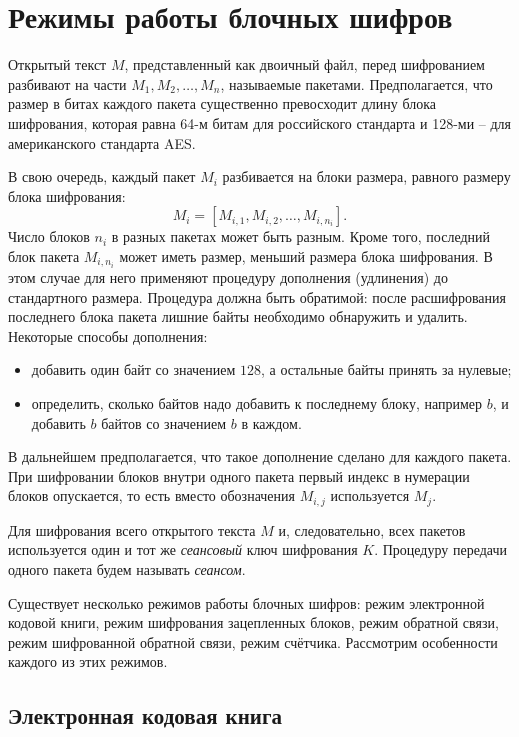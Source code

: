 \section{Режимы работы блочных шифров}\label{section-block-chaining}

Открытый текст $M$, представленный как двоичный файл, перед шифрованием разбивают на части $M_1, M_2, \dots, M_n$, называемые пакетами. Предполагается, что размер в битах каждого пакета существенно превосходит длину блока шифрования, которая равна 64-м битам для российского стандарта и 128-ми -- для американского стандарта AES.

В свою очередь, каждый пакет $M_i$ разбивается на блоки размера, равного размеру блока шифрования:
    \[ M_i = \left[ M_{i,1}, M_{i,2}, \dots, M_{i,n_i} \right]. \]
Число блоков $n_i$ в разных пакетах может быть разным. Кроме того, последний блок пакета $M_{i,n_i}$ может иметь размер, меньший размера блока шифрования. В этом случае для него применяют процедуру дополнения (удлинения) до стандартного размера. Процедура должна быть обратимой: после расшифрования последнего блока пакета лишние байты необходимо обнаружить и удалить. Некоторые способы дополнения:
\begin{itemize}
  \item добавить один байт со значением $128$, а остальные байты принять за нулевые;
  \item определить, сколько байтов надо добавить к последнему блоку, например $b$, и добавить $b$ байтов со значением $b$ в каждом.
\end{itemize}
В дальнейшем предполагается, что такое дополнение сделано для каждого пакета. При шифровании блоков внутри одного пакета первый индекс в нумерации блоков опускается, то есть вместо обозначения $M_{i,j}$ используется $M_j$.

Для шифрования всего открытого текста $M$ и, следовательно, всех пакетов используется один и тот же \emph{сеансовый} ключ шифрования $K$. Процедуру передачи одного пакета будем называть \emph{сеансом}.

Существует несколько режимов работы блочных шифров: режим электронной кодовой книги, режим шифрования зацепленных блоков, режим обратной связи, режим шифрованной обратной связи, режим счётчика. Рассмотрим особенности каждого из этих режимов.


\subsection{Электронная кодовая книга}

